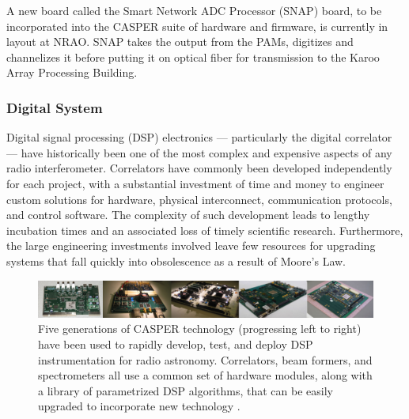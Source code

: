 \documentclass[preprint]{aastex}
\begin{document}
A new board called the Smart Network ADC Processor (SNAP) board, to be incorporated 
into the CASPER suite of hardware and firmware, is currently in layout at NRAO.  SNAP
takes the output from the PAMs, digitizes and channelizes it before putting it on optical fiber
for transmission to the Karoo Array Processing Building.



\subsubsection{Digital System}

Digital signal processing (DSP) electronics --- particularly the digital correlator ---
have historically been one of the most complex and expensive aspects of any radio interferometer.
Correlators have commonly been
developed independently for each project, with a substantial investment
of time and money to engineer
custom solutions for hardware, physical interconnect,
communication protocols, and control software. The complexity of such development
leads to lengthy incubation times and an
associated loss of timely scientific research. Furthermore, the large
engineering investments involved leave few resources
for upgrading systems that fall quickly into obsolescence as a result
of Moore's Law.

\begin{figure}[!ht]\centering
\includegraphics[width=6.5in]{plots/casper_boards.jpg}
\caption{
Five generations of CASPER technology (progressing left to right) have been used to rapidly
develop, test, and deploy DSP instrumentation for radio astronomy.  Correlators,
beam formers, and spectrometers all use a common set of hardware modules, along with a library
of parametrized DSP algorithms, that can be easily upgraded to incorporate new technology
\citep{parsons_et_al2006,parsons_et_al2008}.
}\label{fig:casper_boards}
\end{figure}
\end{document}
